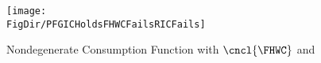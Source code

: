 \hypertarget{PFGICHoldsFHWCFailsRICFails}{}
\begin{figure}
\centerline{\texttt{[image: \\FigDir/PFGICHoldsFHWCFailsRICFails]}}
\caption{Nondegenerate Consumption Function with $\cncl{\FHWC}$ and \cncl{\RIC}}
\label{fig:PFGICHoldsFHWCFailsRICFails}
\end{figure}
